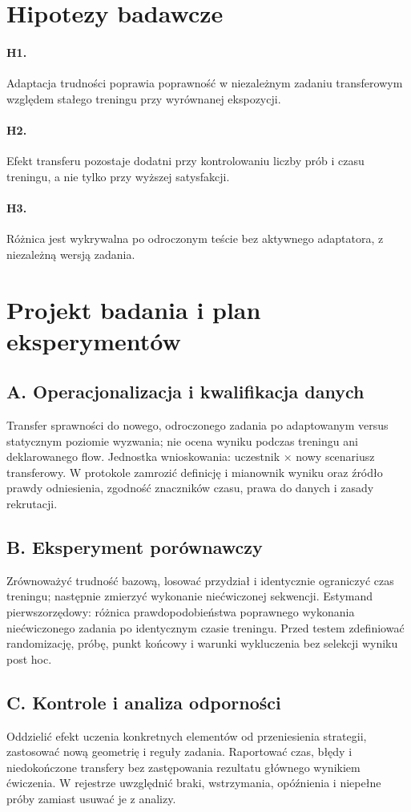 \documentclass[11pt,a4paper]{article}
\begin{document}
\section{Hipotezy badawcze}
\paragraph{H1.} Adaptacja trudności poprawia poprawność w niezależnym zadaniu transferowym względem stałego treningu przy wyrównanej ekspozycji.
\paragraph{H2.} Efekt transferu pozostaje dodatni przy kontrolowaniu liczby prób i czasu treningu, a nie tylko przy wyższej satysfakcji.
\paragraph{H3.} Różnica jest wykrywalna po odroczonym teście bez aktywnego adaptatora, z niezależną wersją zadania.
\section{Projekt badania i plan eksperymentów}
\subsection{A. Operacjonalizacja i kwalifikacja danych}
Transfer sprawności do nowego, odroczonego zadania po adaptowanym versus statycznym poziomie wyzwania; nie ocena wyniku podczas treningu ani deklarowanego flow. Jednostka wnioskowania: uczestnik × nowy scenariusz transferowy. W protokole zamrozić definicję i mianownik wyniku oraz źródło prawdy odniesienia, zgodność znaczników czasu, prawa do danych i zasady rekrutacji.
\subsection{B. Eksperyment porównawczy}
Zrównoważyć trudność bazową, losować przydział i identycznie ograniczyć czas treningu; następnie zmierzyć wykonanie niećwiczonej sekwencji. Estymand pierwszorzędowy: różnica prawdopodobieństwa poprawnego wykonania niećwiczonego zadania po identycznym czasie treningu. Przed testem zdefiniować randomizację, próbę, punkt końcowy i warunki wykluczenia bez selekcji wyniku post hoc.
\subsection{C. Kontrole i analiza odporności}
Oddzielić efekt uczenia konkretnych elementów od przeniesienia strategii, zastosować nową geometrię i reguły zadania. Raportować czas, błędy i niedokończone transfery bez zastępowania rezultatu głównego wynikiem ćwiczenia. W rejestrze uwzględnić braki, wstrzymania, opóźnienia i niepełne próby zamiast usuwać je z analizy.
\end{document}
